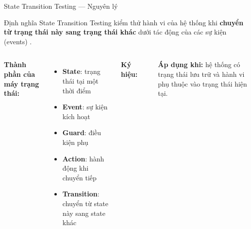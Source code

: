 \documentclass[aspectratio=169,12pt]{beamer}
\begin{document}
\begin{frame}[shrink=10]{State Transition Testing --- Nguyên lý}
  \begin{block}{Định nghĩa}
    State Transition Testing kiểm thử hành vi của hệ thống khi
    \textbf{chuyển từ trạng thái này sang trạng thái khác}
    dưới tác động của các sự kiện (events) \cite{istqb-ctfl,beizer-testing}.
  \end{block}

  \vspace{0.1em}
  \small
  \begin{columns}[T,totalwidth=\textwidth]
    \textbf{Thành phần của máy trạng thái:}
    \begin{itemize}
      \item \textbf{State}: trạng thái tại một thời điểm
      \item \textbf{Event}: sự kiện kích hoạt
      \item \textbf{Guard}: điều kiện phụ
      \item \textbf{Action}: hành động khi chuyển tiếp
      \item \textbf{Transition}: chuyển từ state này sang state khác
    \end{itemize}

    \textbf{Ký hiệu:}
    \begin{center}
    \end{center}

    \vspace{0.3em}
    \textbf{Áp dụng khi:} hệ thống có trạng thái lưu trữ và hành vi
    phụ thuộc vào trạng thái hiện tại.
  \end{columns}
\end{frame}
\end{document}
